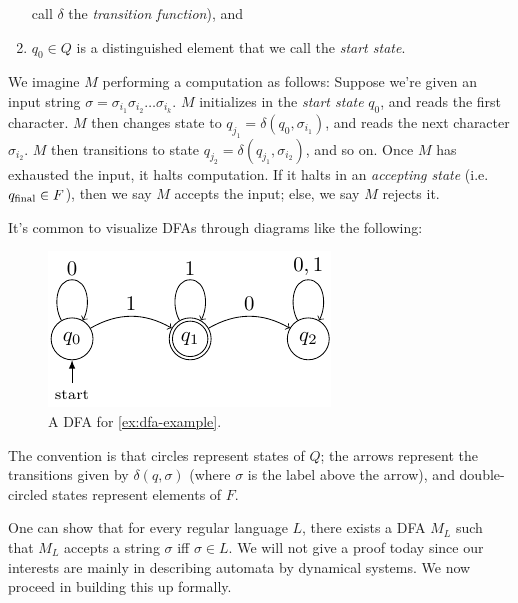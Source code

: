 \documentclass{fkpaper}
\begin{document}
\begin{multicols}{2}
\begin{definition}
\begin{enumerate}
      call $\delta$ the \emph{transition function}), and
    \item $q_0 \in Q$ is a distinguished element that we call the
      \emph{start state}. \qedhere
  \end{enumerate}
\end{definition}
We imagine $M$ performing a computation as follows: Suppose we're
given an input string $\sigma = \sigma_{i_1} \sigma_{i_2} \ldots
\sigma_{i_k}$. $M$ initializes in the \emph{start state} $q_0$, and
reads the first character. $M$ then changes state to $q_{j_1} =
\delta(q_0, \sigma_{i_1})$, and reads the next character
$\sigma_{i_2}$. $M$ then transitions to state $q_{j_2} =
\delta(q_{j_1}, \sigma_{i_2})$, and so on. Once $M$ has exhausted the
input, it halts computation. If it halts in an \emph{accepting state}
(i.e.\ $q_{\rm final} \in F$), then we say $M$ accepts the input;
else, we say $M$ rejects it.

It's common to visualize DFAs through diagrams like the following:
\begin{figure}[H]
  \centering
  \includegraphics[scale=1.2]{figures/dfa-example.pdf}
  \caption{A DFA for \cref{ex:dfa-example}.}
\end{figure}
The convention is that circles represent states of $Q$; the arrows
represent the transitions given by $\delta(q, \sigma)$ (where $\sigma$
is the label above the arrow), and double-circled states represent
elements of $F$.

One can show that for every regular language $L$, there exists a DFA
$M_L$ such that $M_L$ accepts a string $\sigma$ iff $\sigma \in L$. We
will not give a proof today since our interests are mainly in
describing automata by dynamical systems. We now proceed in building
this up formally.


\end{multicols}
\end{document}
